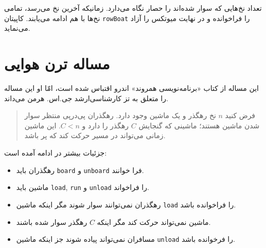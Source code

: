 \documentclass{book}
\newcommand{\clearemptydoublepage}{\newpage\cleardoublepage}
\begin{document}
    تعداد نخ‌هایی که سوار شده‌اند را حصار نگاه می‌دارد. زمانیکه آخرین نخ می‌رسد، تمامی نخ‌ها با هم ادامه می‌یابند. 
    کاپیتان  {\tt rowBoat} را فراخوانده و در نهایت میوتکس را آزاد می‌نماید. 
    


\clearemptydoublepage
\section{مساله ترن هوایی}

    این مساله از کتاب «برنامه‌نویسی همروند» اندرو اقتباس شده است، 
    امّا او این مساله را متعلق به تز کارشناسی‌ارشد جی.‌اس. هرمن می‌داند. 

\begin {quotation}
    فرض کنید $n$ نخ رهگذر و یک ماشین وجود دارد. رهگذران پی‌درپی منتظر سوار شدن ماشین هستند؛ ماشینی که گنجایش $C$  رهگذر را دارد و $C<n$. 
    این ماشین زمانی می‌تواند در مسیر حرکت کند که پر باشد. 
\end{quotation}

    جزئیات بیشتر در ادامه آمده است:

\begin{itemize}

\item %
    رهگذران باید {\tt board} و {\tt unboard} فرا خوانند. 

\item %
    ماشین باید {\tt load}, {\tt run} و {\tt unload} را فراخواند. 

\item %
    رهگذران نمی‌توانند سوار شوند مگر اینکه ماشین {\tt load} را فراخوانده باشد. 

\item %
    ماشین نمی‌تواند حرکت کند مگر اینکه $C$ رهگذر سوار شده باشند. 

\item %
    مسافران نمی‌تواند پیاده شوند جز اینکه ماشین {\tt unload} را فرخوانده باشد. 

\end{itemize}
\end{document}
